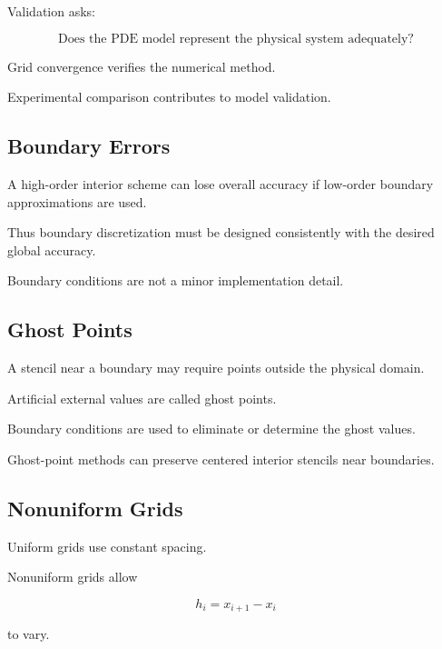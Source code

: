 Validation asks:

\[
\boxed{
\text{Does the PDE model represent the physical system adequately?}
}
\]

Grid convergence verifies the numerical method.

Experimental comparison contributes to model validation.

\subsection{Boundary Errors}
\label{subsec:pde-boundary-errors}

A high-order interior scheme can lose overall accuracy if low-order
boundary approximations are used.

Thus boundary discretization must be designed consistently with the desired
global accuracy.

Boundary conditions are not a minor implementation detail.

\subsection{Ghost Points}
\label{subsec:pde-ghost-points}

A stencil near a boundary may require points outside the physical domain.

Artificial external values are called ghost points.

Boundary conditions are used to eliminate or determine the ghost values.

Ghost-point methods can preserve centered interior stencils near
boundaries.

\subsection{Nonuniform Grids}
\label{subsec:pde-nonuniform-grids}

Uniform grids use constant spacing.

Nonuniform grids allow

\[
\boxed{
h_i
=
x_{i+1}-x_i
}
\]

to vary.

